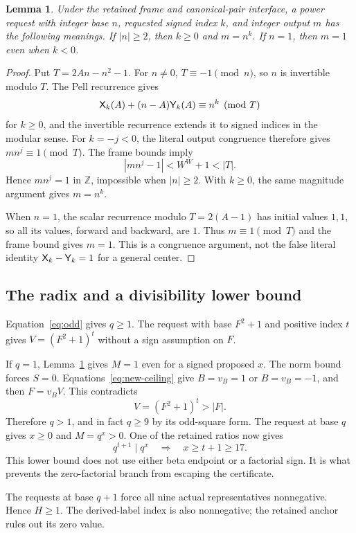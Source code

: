 \documentclass[11pt,letterpaper]{article}
\newtheorem{lemma}[theorem]{Lemma}
\theoremstyle{remark}\newtheorem{remark}[theorem]{Remark}
\newcommand{\Z}{\mathbb Z}\newcommand{\N}{\mathbb N}
\begin{document}
\begin{lemma}\label{lem:power}
Under the retained frame and canonical-pair interface, a power request with integer base $n$, requested signed index $k$, and integer output $m$ has the following meanings. If $|n|\ge2$, then $k\ge0$ and $m=n^k$. If $n=1$, then $m=1$ even when $k<0$.
\end{lemma}
\begin{proof}
Put $T=2An-n^2-1$. For $n\ne0$, $T\equiv-1\pmod n$, so $n$ is invertible modulo $T$. The Pell recurrence gives
\[
 \mathsf X_k(A)+(n-A)\mathsf Y_k(A)\equiv n^k\pmod T
\]
for $k\ge0$, and the invertible recurrence extends it to signed indices in the modular sense. For $k=-j<0$, the literal output congruence therefore gives $mn^j\equiv1\pmod T$. The frame bounds imply
\[
 |mn^j-1|<W^W+1<|T|.
\]
Hence $mn^j=1$ in $\Z$, impossible when $|n|\ge2$. With $k\ge0$, the same magnitude argument gives $m=n^k$.

When $n=1$, the scalar recurrence modulo $T=2(A-1)$ has initial values $1,1$, so all its values, forward and backward, are $1$. Thus $m\equiv1\pmod T$ and the frame bound gives $m=1$. This is a congruence argument, not the false literal identity $\mathsf X_k-\mathsf Y_k=1$ for a general center.
\end{proof}

\subsection{The radix and a divisibility lower bound}
Equation~\eqref{eq:odd} gives $q\ge1$. The request with base $F^2+1$ and positive index $t$ gives $V=(F^2+1)^t$ without a sign assumption on $F$.

If $q=1$, Lemma~\ref{lem:power} gives $M=1$ even for a signed proposed $x$. The norm bound forces $S=0$. Equations~\eqref{eq:new-ceiling} give $B=v_B=1$ or $B=v_B=-1$, and then $F=v_BV$. This contradicts
\[
 V=(F^2+1)^t>|F|.
\]
Therefore $q>1$, and in fact $q\ge9$ by its odd-square form. The request at base $q$ gives $x\ge0$ and $M=q^x>0$. One of the retained ratios now gives
\begin{equation}\label{eq:xlower}
 q^{t+1}\mid q^x\quad\Longrightarrow\quad x\ge t+1\ge17.
\end{equation}
This lower bound does not use either beta endpoint or a factorial sign. It is what prevents the zero-factorial branch from escaping the certificate.

The requests at base $q+1$ force all nine actual representatives nonnegative. Hence $H\ge1$. The derived-label index is also nonnegative; the retained anchor rules out its zero value.
\end{document}
